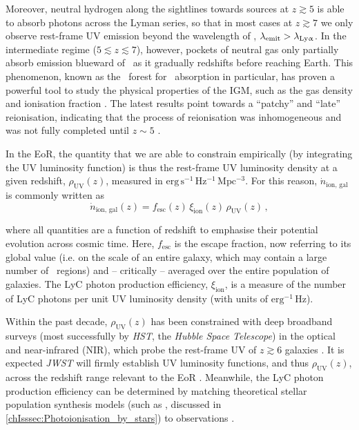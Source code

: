 Moreover, neutral hydrogen along the sightlines towards sources at $z \gtrsim 5$ is able to absorb photons across the Lyman series, so that in most cases at $z \gtrsim 7$ we only observe rest-frame UV emission beyond the wavelength of \lya, $\lambda_\text{emit} > \lambda_\text{{Ly\ensuremath{\upalpha}}}$. In the intermediate regime ($5 \lesssim z \lesssim 7$), however, pockets of neutral gas only partially absorb emission blueward of \lya\ as it gradually redshifts before reaching Earth. This phenomenon, known as the \lya\ forest for \lya\ absorption in particular, has proven a powerful tool to study the physical properties of the IGM, such as the gas density and ionisation fraction \citep{1965ApJ...142.1633G}. The latest results point towards a ``patchy'' and ``late'' reionisation, indicating that the process of reionisation was inhomogeneous \citep[e.g.][]{2020MNRAS.491.1736K} and was not fully completed until $z \sim 5$ \citep[instead of the colloquial value of $z \sim 6$ that is often assumed;][]{2022MNRAS.514...55B}.

In the EoR, the quantity that we are able to constrain empirically (by integrating the UV luminosity function) is thus the rest-frame UV luminosity density at a given redshift, $\rho_\text{UV} (z)$, measured in $\mathrm{erg \, s^{-1} \, Hz^{-1} \, Mpc^{-3}}$. For this reason, $\dot{n}_\text{ion, gal}$ is commonly written as
\begin{equation}
    \label{chIeq:Reionisation_budget}
    \dot{n}_\text{ion, gal} (z) = f_\text{esc} (z) \, \xi_\text{ion} (z) \, \rho_\text{UV} (z) \, ,
\end{equation}

\noindent where all quantities are a function of redshift to emphasise their potential evolution across cosmic time. Here, $f_\text{esc}$ is the escape fraction, now referring to its global value (i.e. on the scale of an entire galaxy, which may contain a large number of \HII\ regions) and -- critically -- averaged over the entire population of galaxies. The LyC photon production efficiency, $\xi_\text{ion}$, is a measure of the number of LyC photons per unit UV luminosity density (with units of $\mathrm{erg^{-1} \, Hz}$).

Within the past decade, $\rho_\text{UV} (z)$ has been constrained with deep broadband surveys (most successfully by \textit{HST}, the \textit{Hubble Space Telescope}) in the optical and near-infrared (NIR), which probe the rest-frame UV of $z \gtrsim 6$ galaxies \citep[typically around $\lambda_\text{emit} \sim 1500 \, \Angstrom$; e.g.][]{2021AJ....162...47B}. It is expected \textit{JWST} will firmly establish UV luminosity functions, and thus $\rho_\text{UV} (z)$, across the redshift range relevant to the EoR \citep[e.g.][]{2022arXiv220801612H}. Meanwhile, the LyC photon production efficiency can be determined by matching theoretical stellar population synthesis models (such as , discussed in \cref{chIsssec:Photoionisation_by_stars}) to observations \citep[e.g.][]{2015MNRAS.454.1393S, 2017MNRAS.467.3306S, 2018MNRAS.479.3264C}.

